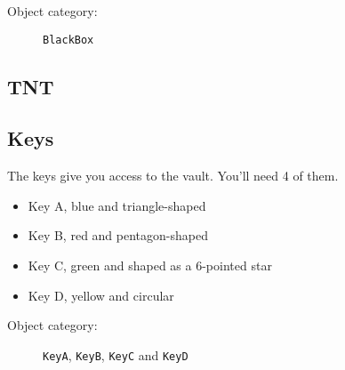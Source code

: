 \begin{description}
    \item[Object category:] \texttt{BlackBox}
\end{description}


\subsection{TNT}



\subsection{Keys}

The keys give you access to the vault. You'll need 4 of them.

\begin{itemize}
    \item Key A, blue and triangle-shaped
    \item Key B, red and pentagon-shaped
    \item Key C, green and shaped as a 6-pointed star
    \item Key D, yellow and circular
\end{itemize}

\begin{description}
    \item[Object category:] \texttt{KeyA}, \texttt{KeyB}, \texttt{KeyC} and \texttt{KeyD}
\end{description}
